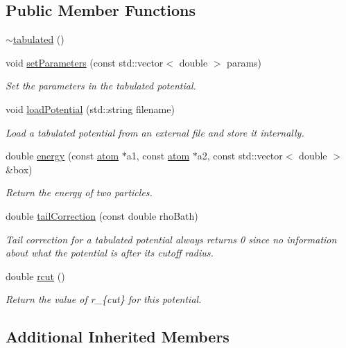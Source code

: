 \subsection*{Public Member Functions}
\begin{DoxyCompactItemize}
\item 
\hyperlink{classtabulated_a069eb60dc00583fd48b7488c9b9ada38}{$\sim$tabulated} ()
\item 
void \hyperlink{classtabulated_a6a52e8a5b99ddd16fcbd3e404c90f559}{set\-Parameters} (const std\-::vector$<$ double $>$ params)
\begin{DoxyCompactList}\small\item\em Set the parameters in the tabulated potential. \end{DoxyCompactList}\item 
void \hyperlink{classtabulated_ad3b3fb94b5db44e91d6768cfe21683c3}{load\-Potential} (std\-::string filename)
\begin{DoxyCompactList}\small\item\em Load a tabulated potential from an external file and store it internally. \end{DoxyCompactList}\item 
double \hyperlink{classtabulated_a6e51813b15f1a08889545c5d79eb4b92}{energy} (const \hyperlink{classatom}{atom} $\ast$a1, const \hyperlink{classatom}{atom} $\ast$a2, const std\-::vector$<$ double $>$ \&box)
\begin{DoxyCompactList}\small\item\em Return the energy of two particles. \end{DoxyCompactList}\item 
double \hyperlink{classtabulated_afb2936dfc0ba4255eb06f9d81e594dd2}{tail\-Correction} (const double rho\-Bath)
\begin{DoxyCompactList}\small\item\em Tail correction for a tabulated potential always returns 0 since no information about what the potential is after its cutoff radius. \end{DoxyCompactList}\item 
double \hyperlink{classtabulated_a1826f920afd53d74e17c8fa5253a2d2b}{rcut} ()
\begin{DoxyCompactList}\small\item\em Return the value of r\-\_\-\{cut\} for this potential. \end{DoxyCompactList}\end{DoxyCompactItemize}
\subsection*{Additional Inherited Members}


